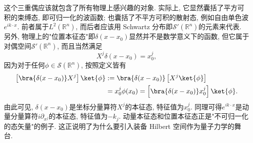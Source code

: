     这个三重偶应该就包含了所有物理上感兴趣的对象. 实际上, 它显然囊括了平方可积的束缚态, 即可归一化的波函数; 也囊括了不平方可积的散射态, 例如自由单色波$e^{ik\cdot x}$. 前者属于$L^2(\mathbb{R}^n)$, 而后者应该用 Schwartz 分布即$\mathcal{S}'(\mathbb{R}^n)$的元素来代表. 另外, 物理上的"位置本征态"即$\delta(x-x_0)$显然并不是数学意义下的函数, 但它属于对偶空间$\mathcal{S}'(\mathbb{R}^n)$, 而且当然满足
$$
X^j\delta(x-x_0)=x_0^j,
$$
因为对于任何$\phi\in\mathcal{S}(\mathbb{R}^n)$, 按照定义皆有
$$
\begin{aligned}
\left[\bra{\delta(x-x_0)}X^j\right]\ket{\phi}
&:=\bra{\delta(x-x_0)}\left[X^j\ket{\phi}\right]\\
&=x_0^j\phi(x_0)
=\left[\bra{\delta(x-x_0)}x_0^j\right]\ket{\phi}.
\end{aligned}
$$
由此可见, $\delta(x-x_0)$是坐标分量算符$X^j$的本征态, 特征值为$x_0^j$. 同理可得$e^{ik\cdot x}$是动量分量算符$i\partial_{x^j}$的本征态, 特征值为$-k_j$. 动量本征态和位置本征态正是"不可归一化的态矢量"的例子. 这正说明了为什么要引入装备 Hilbert 空间作为量子力学的舞台.
